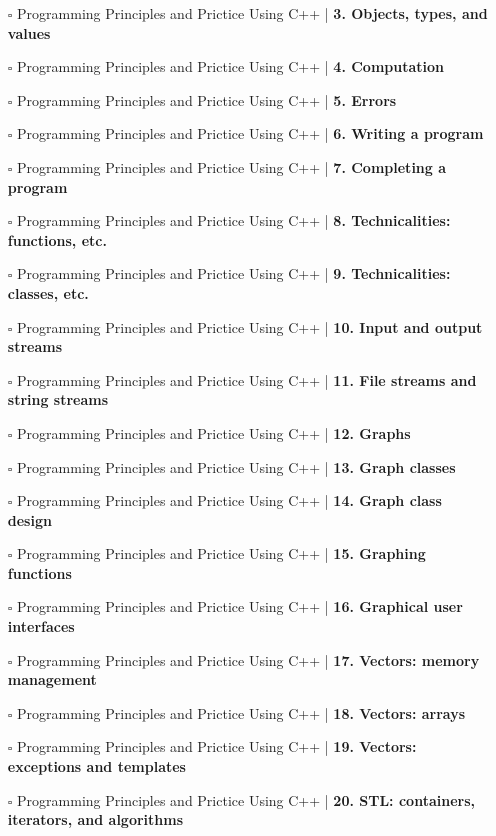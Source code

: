 \documentclass[a4, landscape, 12pt]{article}
\newcommand{\checkbox}{$\square$}%
\begin{document}
\begin{itemize}
{}
\item [\checkbox]  Programming Principles and Prictice Using C++  | \textbf{ 3. Objects, types, and values
}
\item [\checkbox]  Programming Principles and Prictice Using C++  | \textbf{ 4. Computation
}
\item [\checkbox]  Programming Principles and Prictice Using C++  | \textbf{ 5. Errors
}
\item [\checkbox]  Programming Principles and Prictice Using C++  | \textbf{ 6. Writing a program
}
\item [\checkbox]  Programming Principles and Prictice Using C++  | \textbf{ 7. Completing a program
}
\item [\checkbox]  Programming Principles and Prictice Using C++  | \textbf{ 8. Technicalities: functions, etc.
}
\item [\checkbox]  Programming Principles and Prictice Using C++  | \textbf{ 9. Technicalities: classes, etc.
}
\item [\checkbox]  Programming Principles and Prictice Using C++  | \textbf{ 10. Input and output streams
}
\item [\checkbox]  Programming Principles and Prictice Using C++  | \textbf{ 11. File streams and string streams
}
\item [\checkbox]  Programming Principles and Prictice Using C++  | \textbf{ 12. Graphs
}
\item [\checkbox]  Programming Principles and Prictice Using C++  | \textbf{ 13. Graph classes
}
\item [\checkbox]  Programming Principles and Prictice Using C++  | \textbf{ 14. Graph class design
}
\item [\checkbox]  Programming Principles and Prictice Using C++  | \textbf{ 15. Graphing functions
}
\item [\checkbox]  Programming Principles and Prictice Using C++  | \textbf{ 16. Graphical user interfaces
}
\item [\checkbox]  Programming Principles and Prictice Using C++  | \textbf{ 17. Vectors: memory management
}
\item [\checkbox]  Programming Principles and Prictice Using C++  | \textbf{ 18. Vectors: arrays
}
\item [\checkbox]  Programming Principles and Prictice Using C++  | \textbf{ 19. Vectors: exceptions and templates
}
\item [\checkbox]  Programming Principles and Prictice Using C++  | \textbf{ 20. STL: containers, iterators, and algorithms
}
\end{itemize}
\end{document}
